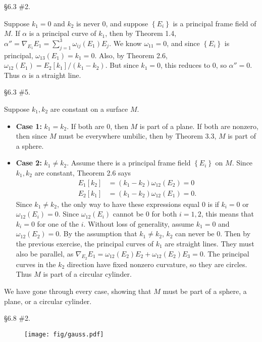 \documentclass[10pt]{report}
\begin{document}

\begin{exer}[]
\S 6.3 \#2.
\end{exer}
Suppose $k_1=0$ and $k_2$ is never 0, and suppose $\left\{ E_i \right\}$ is a principal frame field of $M$. If $\alpha$ is a principal curve of $k_1$, then by Theorem 1.4, $\alpha'' = \nabla_{E_1}E_1= \sum_{j=1}^{3} \omega_{ij}(E_1)E_j$. We know $\omega_{11}=0$, and since $\left\{ E_i \right\}$ is principal, $\omega_{13}(E_1)=k_1=0$. Also, by Theorem 2.6, $\omega_{12}(E_1)=E_2[k_1]/(k_1-k_2)$. But since $k_1=0$, this reduces to 0, so $\alpha''=0$. Thus $\alpha$ is a straight line.

\begin{exer}[]
\S 6.3 \#5.
\end{exer}
Suppose $k_1,k_2$ are constant on a surface $M$.
\begin{itemize}
	\item \textbf{Case 1:} $k_1=k_2$. If both are 0, then $M$ is part of a plane. If both are nonzero, then since $M$ must be everywhere umbilic, then by Theorem 3.3, $M$ is part of a sphere.
	\item \textbf{Case 2:} $k_1 \neq k_2$. Assume there is a principal frame field $\left\{ E_i \right\}$ on $M$. Since $k_1,k_2$ are constant, Theorem 2.6 says
		\begin{align*}
			E_1[k_2] &= (k_1-k_2)\omega_{12}(E_2)=0\\
			E_2[k_1] &= (k_1-k_2)\omega_{12}(E_1)=0.
		\end{align*} Since $k_1 \neq k_2$, the only way to have these expressions equal 0 is if $k_i=0$ or $\omega_{12}(E_i)=0$. Since $\omega_{12}(E_i)$ cannot be 0 for both $i=1,2$, this means that $k_i=0$ for one of the $i$. Without loss of generality, assume $k_1=0$ and $\omega_{12}(E_2)=0$. By the assumption that $k_1 \neq k_2$, $k_2$ can never be 0. Then by the previous exercise, the principal curves of $k_1$ are straight lines. They must also be parallel, as $\nabla_{E_2}E_1 = \omega_{12}(E_2)E_2 + \omega_{12}(E_2)E_3 = 0$. The principal curves in the $k_2$ direction have fixed nonzero curvature, so they are circles. Thus $M$ is part of a circular cylinder.
\end{itemize}
		We have gone through every case, showing that $M$ must be part of a sphere, a plane, or a circular cylinder.
		\pagebreak

\begin{exer}[]
\S 6.8 \#2.
\end{exer}
\begin{figure}[H]
	\centering
	\texttt{[image: fig/gauss.pdf]}
	\caption{}
\end{figure}
\end{document}
